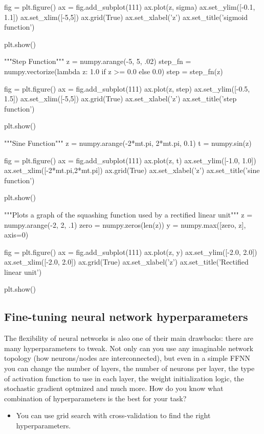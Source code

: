 \documentclass[%
oneside,                 %
final,                   %
10pt]{article}
\begin{document}
fig = plt.figure()
ax = fig.add_subplot(111)
ax.plot(z, sigma)
ax.set_ylim([-0.1, 1.1])
ax.set_xlim([-5,5])
ax.grid(True)
ax.set_xlabel('z')
ax.set_title('sigmoid function')

plt.show()

"""Step Function"""
z = numpy.arange(-5, 5, .02)
step_fn = numpy.vectorize(lambda z: 1.0 if z >= 0.0 else 0.0)
step = step_fn(z)

fig = plt.figure()
ax = fig.add_subplot(111)
ax.plot(z, step)
ax.set_ylim([-0.5, 1.5])
ax.set_xlim([-5,5])
ax.grid(True)
ax.set_xlabel('z')
ax.set_title('step function')

plt.show()

"""Sine Function"""
z = numpy.arange(-2*mt.pi, 2*mt.pi, 0.1)
t = numpy.sin(z)

fig = plt.figure()
ax = fig.add_subplot(111)
ax.plot(z, t)
ax.set_ylim([-1.0, 1.0])
ax.set_xlim([-2*mt.pi,2*mt.pi])
ax.grid(True)
ax.set_xlabel('z')
ax.set_title('sine function')

plt.show()

"""Plots a graph of the squashing function used by a rectified linear
unit"""
z = numpy.arange(-2, 2, .1)
zero = numpy.zeros(len(z))
y = numpy.max([zero, z], axis=0)

fig = plt.figure()
ax = fig.add_subplot(111)
ax.plot(z, y)
ax.set_ylim([-2.0, 2.0])
ax.set_xlim([-2.0, 2.0])
ax.grid(True)
ax.set_xlabel('z')
ax.set_title('Rectified linear unit')

plt.show()

\epycod


\subsection{Fine-tuning neural network hyperparameters}

The flexibility of neural networks is also one of their main
drawbacks: there are many hyperparameters to tweak. Not only can you
use any imaginable network topology (how neurons/nodes are
interconnected), but even in a simple FFNN you can change the number
of layers, the number of neurons per layer, the type of activation
function to use in each layer, the weight initialization logic, the
stochastic gradient optmized and much more. How do you know what
combination of hyperparameters is the best for your task?

\begin{itemize}
\item You can use grid search with cross-validation to find the right hyperparameters.
\end{itemize}
\end{document}

